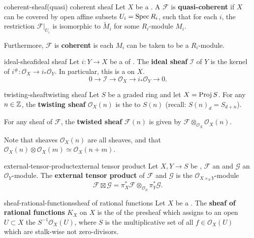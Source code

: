 \begin{topic}{coherent-sheaf}{(quasi) coherent sheaf}
    Let $X$ be a . A  $\mathcal{F}$ is \textbf{quasi-coherent} if $X$ can be covered by open affine subsets $U_i = \operatorname{Spec} R_i$, such that for each $i$, the restriction $\mathcal{F}|_{U_i}$ is isomorphic to $\tilde{M}_i$ for some $R_i$-module $M_i$.
    
    Furthermore, $\mathcal{F}$ is \textbf{coherent} is each $M_i$ can be taken to be a  $R_i$-module.
\end{topic}

\begin{topic}{ideal-sheaf}{ideal sheaf}
    Let $i : Y \to X$ be a  of . The \textbf{ideal sheaf} $\mathcal{I}$ of $Y$ is the kernel of $i^\# : \mathcal{O}_X \to i_* \mathcal{O}_Y$. In particular, this is a  on $X$.
    \[ 0 \to \mathcal{I} \to \mathcal{O}_X \to i_* \mathcal{O}_Y \to 0 . \]
\end{topic}

\begin{topic}{twisting-sheaf}{twisting sheaf}
    Let $S$ be a graded ring and let $X = \operatorname{Proj} S$. For any $n \in \mathbb{Z}$, the \textbf{twisting sheaf} $\mathcal{O}_X(n)$ is the  to $S(n)$ (recall: $S(n)_d = S_{d + n}$).
    
    For any sheaf of  $\mathcal{F}$, the \textbf{twisted sheaf} $\mathcal{F}(n)$ is given by $\mathcal{F} \otimes_{\mathcal{O}_X} \mathcal{O}_X(n)$.
    
    Note that sheaves $\mathcal{O}_X(n)$ are all  sheaves, and that $\mathcal{O}_X(n) \otimes \mathcal{O}_X(m) \simeq \mathcal{O}_X(n + m)$.
\end{topic}

\begin{topic}{external-tensor-product}{external tensor product}
    Let $X, Y \to S$ be , $\mathcal{F}$ an  and $\mathcal{G}$ an $\mathcal{O}_Y$-module. The \textbf{external tensor product} of $\mathcal{F}$ and $\mathcal{G}$ is the $\mathcal{O}_{X \times_S Y}$-module
    \[ \mathcal{F} \boxtimes \mathcal{G} = \pi_X^* \mathcal{F} \otimes_{\mathcal{O}_S} \pi_Y^* \mathcal{G} . \]
\end{topic}

\begin{topic}{sheaf-rational-functions}{sheaf of rational functions}
    Let $X$ be a . The \textbf{sheaf of rational functions} $K_X$ on $X$ is the  of the presheaf which assigns to an open $U \subset X$ the  $S^{-1} \mathcal{O}_X(U)$, where $S$ is the multiplicative set of all $f \in \mathcal{O}_X(U)$ which are stalk-wise not zero-divisors.
\end{topic}
